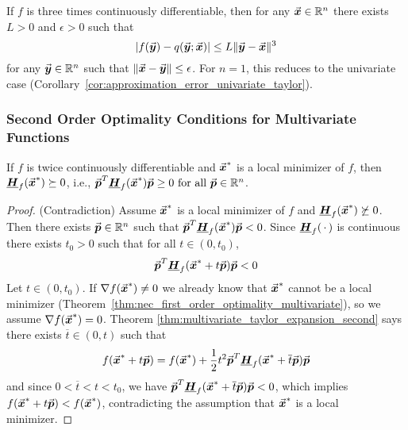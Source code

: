 \begin{corollary}
\label{cor:approximation_error_multivariate_taylor_second}
If \(f\) is three times continuously differentiable, then for any \(\vec{\boldsymbol{x}}\in\mathbb{R}^{n}\) there exists \(L>0\) and \(\epsilon>0\) such that
\[
\left|f(\vect{y})-q(\vect{y};\vect{x})\right|\le L\|\vect{y}-\vect{x}\|^3 %
\]
for any \(\vec{\boldsymbol{y}}\in\mathbb{R}^{n}\) such that \(\|\vec{\boldsymbol{x}}-\vec{\boldsymbol{y}}\|\le\epsilon\). For \(n=1\), this reduces to the univariate case (Corollary~\ref{cor:approximation_error_univariate_taylor}).
\end{corollary}

\subsubsection{Second Order Optimality Conditions for Multivariate Functions}
\label{subsubsec:second_order_optimality_conditions}
\begin{theorem}
\label{thm:second_order_necessary_optimality_condition_multivariate}
If \(f\) is twice continuously differentiable and \(\vec{\boldsymbol{x}}^{*}\) is a local minimizer of \(f\), then \(\underline{\boldsymbol{H}}_{f}(\vec{\boldsymbol{x}}^{*})\succeq 0\), i.e., \(\vec{\boldsymbol{p}}^{T}\underline{\boldsymbol{H}}_{f}(\vec{\boldsymbol{x}}^{*})\vec{\boldsymbol{p}}\ge 0 \text{ for all } \vec{\boldsymbol{p}}\in\mathbb{R}^{n}\).
\end{theorem}
\begin{proof} (Contradiction)
Assume \(\vec{\boldsymbol{x}}^{*}\) is a local minimizer of \(f\) and \(\underline{\boldsymbol{H}}_{f}(\vec{\boldsymbol{x}}^{*})\not \succeq 0\). 
Then there exists \(\vec{\boldsymbol{p}}\in\mathbb{R}^{n}\) such that \(\vec{\boldsymbol{p}}^{T}\underline{\boldsymbol{H}}_{f}(\vec{\boldsymbol{x}}^{*})\vec{\boldsymbol{p}}<0\). 
Since \(\underline{\boldsymbol{H}}_{f}(\, \cdot \,)\) is continuous there exists \(t_{0}>0\) such that for all \(t\in(0,t_{0})\), 
\[
\vect{p}^{T}\matr{H}_{f}(\vect{x}^{*}+t\vect{p})\vect{p}<0 %
\]
Let \(t \in (0,t_{0})\). If \(\nabla f(\vec{\boldsymbol{x}}^{*}) \neq 0\) we already know that \(\vec{\boldsymbol{x}}^{*}\) cannot be a local minimizer (Theorem~\ref{thm:nec_first_order_optimality_multivariate}), so we assume \(\nabla f(\vec{\boldsymbol{x}}^{*}) = 0\). 
Theorem \ref{thm:multivariate_taylor_expansion_second} says there exists \(\overline{t}\in(0,t)\) such that
\[
f(\vect{x}^{*}+t\vect{p})=f(\vect{x}^{*})+\frac{1}{2}t^{2}\vect{p}^{T}\matr{H}_{f}(\vect{x}^{*}+\overline{t}\vect{p})\vect{p} %
\]
and since \(0 < \overline{t} < t < t_{0}\), we have \(\vec{\boldsymbol{p}}^{T}\underline{\boldsymbol{H}}_{f}(\vec{\boldsymbol{x}}^{*}+\overline{t}\vec{\boldsymbol{p}})\vec{\boldsymbol{p}}<0\), which implies \(f(\vec{\boldsymbol{x}}^{*}+t\vec{\boldsymbol{p}})<f(\vec{\boldsymbol{x}}^{*})\), contradicting the assumption that \(\vec{\boldsymbol{x}}^{*}\) is a local minimizer.
\end{proof}

